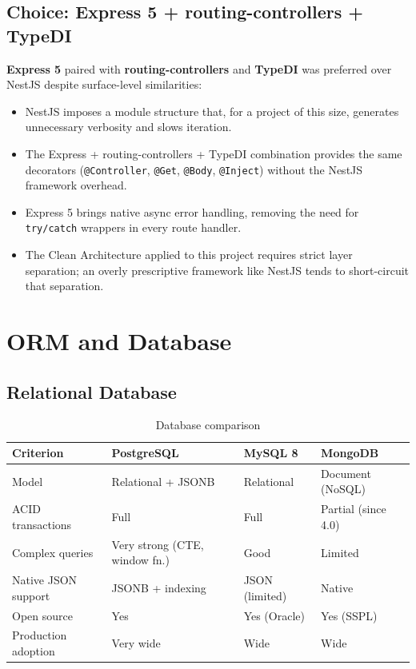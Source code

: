 \subsection{Choice: Express 5 + routing-controllers + TypeDI}

\textbf{Express 5} paired with \textbf{routing-controllers} and \textbf{TypeDI}
was preferred over NestJS despite surface-level similarities:
\begin{itemize}
  \item NestJS imposes a module structure that, for a project of this size,
        generates unnecessary verbosity and slows iteration.
  \item The Express + routing-controllers + TypeDI combination provides the same
        decorators (\texttt{@Controller}, \texttt{@Get}, \texttt{@Body},
        \texttt{@Inject}) without the NestJS framework overhead.
  \item Express 5 brings native async error handling, removing the need for
        \texttt{try/catch} wrappers in every route handler.
  \item The Clean Architecture applied to this project requires strict layer
        separation; an overly prescriptive framework like NestJS tends to
        short-circuit that separation.
\end{itemize}

\section{ORM and Database}

\subsection{Relational Database}

\begin{table}[H]
\centering
\caption{Database comparison}
\begin{tabularx}{\textwidth}{|l|X|X|X|}
\hline
\rowcolor{gray!20}
\textbf{Criterion} & \textbf{PostgreSQL} & \textbf{MySQL 8} & \textbf{MongoDB} \\
\hline
Model & \cellcolor{green!15}Relational + JSONB & Relational & Document (NoSQL) \\
\hline
ACID transactions & \cellcolor{green!15}Full & Full & Partial (since 4.0) \\
\hline
Complex queries & \cellcolor{green!15}Very strong (CTE, window fn.) & Good & Limited \\
\hline
Native JSON support & \cellcolor{green!15}JSONB + indexing & JSON (limited) & Native \\
\hline
Open source & \cellcolor{green!15}Yes & Yes (Oracle) & Yes (SSPL) \\
\hline
Production adoption & \cellcolor{green!15}Very wide & Wide & Wide \\
\hline
\end{tabularx}
\end{table}

